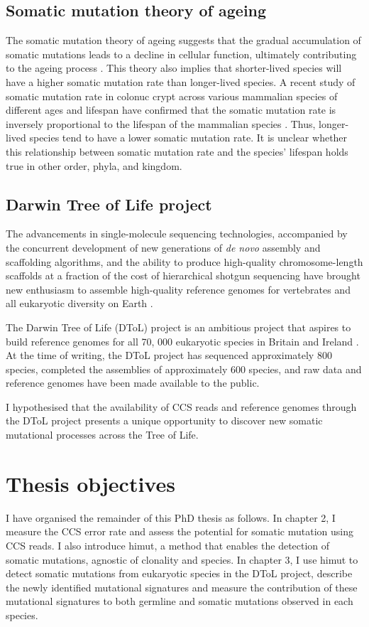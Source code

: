 \subsection{Somatic mutation theory of ageing}

The somatic mutation theory of ageing suggests that the gradual accumulation of somatic mutations leads to a decline in cellular function, ultimately contributing to the ageing process \cite{Szilard1959-ru}. This theory also implies that shorter-lived species will have a higher somatic mutation rate than longer-lived species. A recent study of somatic mutation rate in colonuc crypt across various mammalian species of different ages and lifespan have confirmed that the somatic mutation rate is inversely proportional to the lifespan of the mammalian species \cite{Cagan2022-yn}. Thus, longer-lived species tend to have a lower somatic mutation rate. It is unclear whether this relationship between somatic mutation rate and the species’ lifespan holds true in other order, phyla, and kingdom.

\subsection{Darwin Tree of Life project}

The advancements in single-molecule sequencing technologies, accompanied by the concurrent development of new generations of \textit{de novo} assembly and scaffolding algorithms, and the ability to produce high-quality chromosome-length scaffolds at a fraction of the cost of hierarchical shotgun sequencing have brought new enthusiasm to assemble high-quality reference genomes for vertebrates \cite{Rhie2021-dq} and all eukaryotic diversity on Earth \cite{Lewin2018-zf}. 

The Darwin Tree of Life (DToL) project is an ambitious project that aspires to build reference genomes for all 70, 000 eukaryotic species in Britain and Ireland \cite{Darwin_Tree_of_Life_Project_Consortium2022-ma}. At the time of writing, the DToL project has sequenced approximately 800 species, completed the assemblies of approximately 600 species, and raw data and reference genomes have been made available to the public.

I hypothesised that the availability of CCS reads and reference genomes through the DToL project presents a unique opportunity to discover new somatic mutational processes across the Tree of Life. 

\section{Thesis objectives}

I have organised the remainder of this PhD thesis as follows. In chapter 2, I measure the CCS error rate and assess the potential for somatic mutation using CCS reads. I also introduce himut, a method that enables the detection of somatic mutations, agnostic of clonality and species. In chapter 3, I use himut to detect somatic mutations from eukaryotic species in the DToL project, describe the newly identified mutational signatures and measure the contribution of these mutational signatures to both germline and somatic mutations observed in each species.


